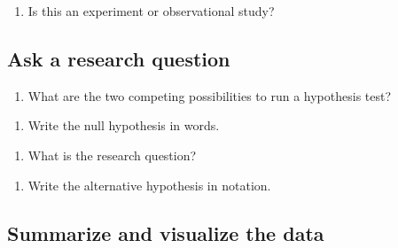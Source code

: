 \documentclass[
]{report}
\providecommand{\tightlist}{%
  \setlength{\itemsep}{0pt}\setlength{\parskip}{0pt}}
\begin{document}
\vspace{1in}

\begin{enumerate}
\def\labelenumi{\arabic{enumi}.}
\setcounter{enumi}{3}
\tightlist
\item
  Is this an experiment or observational study?
\end{enumerate}

\vspace{0.5in}

\hypertarget{ask-a-research-question}{%
\subsection{Ask a research question}\label{ask-a-research-question}}

\begin{enumerate}
\def\labelenumi{\arabic{enumi}.}
\setcounter{enumi}{4}
\tightlist
\item
  What are the two competing possibilities to run a hypothesis test?
\end{enumerate}

\vspace{1in}

\begin{enumerate}
\def\labelenumi{\arabic{enumi}.}
\setcounter{enumi}{5}
\tightlist
\item
  Write the null hypothesis in words.
\end{enumerate}

\vspace{1in}

\begin{enumerate}
\def\labelenumi{\arabic{enumi}.}
\setcounter{enumi}{6}
\tightlist
\item
  What is the research question?
\end{enumerate}

\vspace{1in}

\begin{enumerate}
\def\labelenumi{\arabic{enumi}.}
\setcounter{enumi}{7}
\tightlist
\item
  Write the alternative hypothesis in notation.
\end{enumerate}

\vspace{1in}

\hypertarget{summarize-and-visualize-the-data}{%
\subsection{Summarize and visualize the data}\label{summarize-and-visualize-the-data}}
\end{document}
